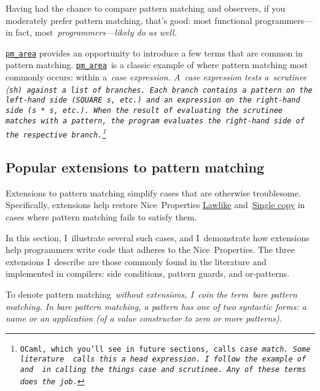 \documentclass[manuscript,screen 12pt, nonacm]{acmart}
\begin{document}
    Having had the chance to compare pattern matching and observers, if you
    moderately prefer pattern matching, that's good: most functional
    programmers---in fact, most~\it{programmers}---likely do as well. 

    \hyperref[fig:pmarea]{\tt{pm\_area}} provides an opportunity to introduce a
    few terms that are common in pattern matching.
    \hyperref[fig:pmarea]{\tt{pm\_area}}~is a classic example of where pattern
    matching most commonly occurs: within a~\it{case} expression. A~\it{case}
    expression tests a~\it{scrutinee} (\tt{sh}) against a list of~\it{branches}.
    Each branch contains a pattern on the left-hand side (\tt{SQUARE s}, etc.)
    and an expression on the right-hand side (\tt{s * s}, etc.). When the result
    of evaluating the scrutinee matches with a pattern, the program evaluates
    the right-hand side of the respective branch.\footnote{OCaml, which you'll
    see in future sections, calls~\it{case}~\tt{match}. Some
    literature~\citep{guardproposal} calls this a~\it{head expression}. I~follow
    the example of~\citet{bpc} and~\citet{maranget} in calling the things
    \it{case} and~\it{scrutinee}. Any of these terms does the job.} 

\subsection{Popular extensions to pattern matching}
\label{extensions}

    Extensions to pattern matching simplify cases that are otherwise
    troublesome. Specifically, extensions help restore Nice~Properties
    \hyperref[p1]{Lawlike} and~\hyperref[p2]{Single copy} in cases where pattern
    matching fails to satisfy them. 
    
    In this section, I~illustrate several such cases, and I~demonstrate how
    extensions help programmers write code that adheres to the Nice~Properties.
    The three extensions I~describe are those commonly found in the literature
    and implemented in compilers: side conditions, pattern guards, and
    or-patterns. 
    
    To denote pattern matching~\it{without} extensions, I~coin the term~\it{bare
    pattern matching}. In bare pattern matching, a pattern has one of two syntactic
    forms: a name or an application (of a value constructor to zero or more
    patterns). 


\end{document}
